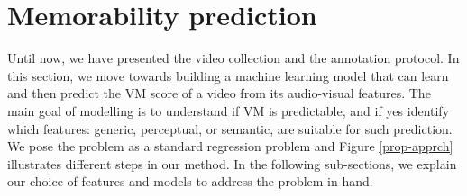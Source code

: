 \documentclass[sigconf]{acmart}
\begin{document}

\section{Memorability prediction} %
\label{mem-pred}
Until now, we have presented the video collection and the annotation protocol. 
In this section, we move towards building a machine learning model that can learn and then predict the VM score of a video from its audio-visual features.
The main goal of modelling is to understand if VM is predictable, and if yes identify which features: generic, perceptual, or semantic, are suitable for such prediction.
We pose the problem as a standard regression problem and Figure \ref{prop-apprch} illustrates different steps in our method.
In the following sub-sections, we explain our choice of features and models to address the problem in hand.
\end{document}
